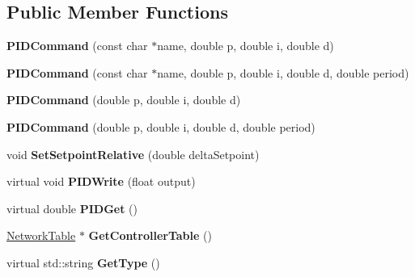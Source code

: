 \subsection*{Public Member Functions}
\begin{DoxyCompactItemize}
\item 
\hypertarget{classPIDCommand_a3e1faabb2c85d21103f6f93e10c1d7bf}{
{\bfseries PIDCommand} (const char $\ast$name, double p, double i, double d)}
\label{classPIDCommand_a3e1faabb2c85d21103f6f93e10c1d7bf}

\item 
\hypertarget{classPIDCommand_a5f4d67e2fc239c4ceb3d4fb6855d6482}{
{\bfseries PIDCommand} (const char $\ast$name, double p, double i, double d, double period)}
\label{classPIDCommand_a5f4d67e2fc239c4ceb3d4fb6855d6482}

\item 
\hypertarget{classPIDCommand_a34235b8d38c75427e7c21e9e8dca4fdc}{
{\bfseries PIDCommand} (double p, double i, double d)}
\label{classPIDCommand_a34235b8d38c75427e7c21e9e8dca4fdc}

\item 
\hypertarget{classPIDCommand_a75eaf6a6fe768760b62f4f7fab412234}{
{\bfseries PIDCommand} (double p, double i, double d, double period)}
\label{classPIDCommand_a75eaf6a6fe768760b62f4f7fab412234}

\item 
\hypertarget{classPIDCommand_ab20c7fb893cf98b084e069d35bf45df8}{
void {\bfseries SetSetpointRelative} (double deltaSetpoint)}
\label{classPIDCommand_ab20c7fb893cf98b084e069d35bf45df8}

\item 
\hypertarget{classPIDCommand_ac37ce85a4755062fb68ec9b01d595155}{
virtual void {\bfseries PIDWrite} (float output)}
\label{classPIDCommand_ac37ce85a4755062fb68ec9b01d595155}

\item 
\hypertarget{classPIDCommand_a8cb2b16bfc3154864a3ba26e2bd8c435}{
virtual double {\bfseries PIDGet} ()}
\label{classPIDCommand_a8cb2b16bfc3154864a3ba26e2bd8c435}

\item 
\hypertarget{classPIDCommand_aebeecf89c7294085cf807b8c7e07b996}{
\hyperlink{classNetworkTable}{NetworkTable} $\ast$ {\bfseries GetControllerTable} ()}
\label{classPIDCommand_aebeecf89c7294085cf807b8c7e07b996}

\item 
\hypertarget{classPIDCommand_a7ffb451ea1e01a718b7df7f1dbc51ae0}{
virtual std::string {\bfseries GetType} ()}
\label{classPIDCommand_a7ffb451ea1e01a718b7df7f1dbc51ae0}

\end{DoxyCompactItemize}
